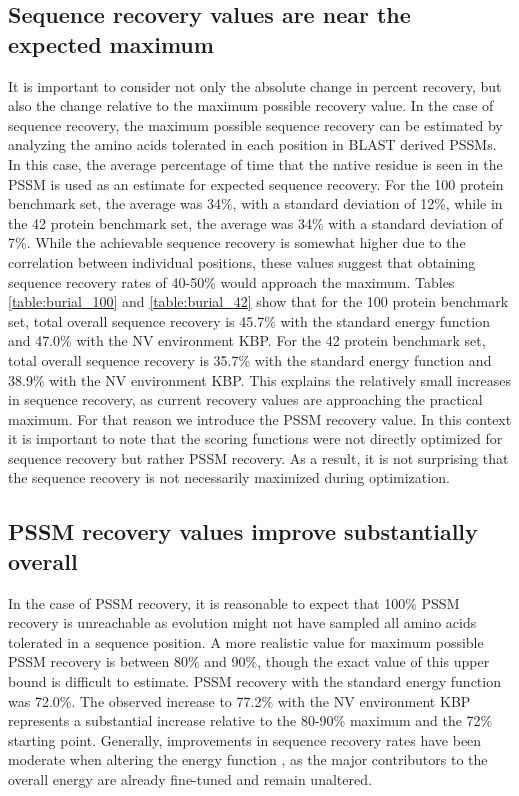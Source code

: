 \subsection{Sequence recovery values are near the expected maximum}
It is important to consider not only the absolute change in percent recovery, but also the change relative to the maximum possible recovery value.
In the case of sequence recovery, the maximum possible sequence recovery can be estimated by analyzing the amino acids tolerated in each position in \ac{BLAST} derived \ac{PSSM}s.
In this case, the average percentage of time that the native residue is seen in the \ac{PSSM} is used as an estimate for expected sequence recovery.
For the 100 protein benchmark set, the average was 34\%, with a standard deviation of 12\%, while in the 42 protein benchmark set, the average was 34\% with a standard deviation of 7\%.
While the achievable sequence recovery is somewhat higher due to the correlation between individual positions, these values suggest that obtaining sequence recovery rates of 40-50\% would approach the maximum.
Tables \ref{table:burial_100} and \ref{table:burial_42} show that for the 100 protein benchmark set, total overall sequence recovery is 45.7\% with the standard energy function and 47.0\% with the \ac{NV} environment \ac{KBP}.
For the 42 protein benchmark set, total overall sequence recovery is 35.7\% with the standard energy function and 38.9\% with the \ac{NV} environment \ac{KBP}.
This explains the relatively small increases in sequence recovery, as current recovery values are approaching the practical maximum.
For that reason we introduce the \ac{PSSM} recovery value.
In this context it is important to note that the scoring functions were not directly optimized for sequence recovery but rather \ac{PSSM} recovery.
As a result, it is not surprising that the sequence recovery is not necessarily maximized during optimization. 

\subsection{PSSM recovery values improve substantially overall}
In the case of \ac{PSSM} recovery, it is reasonable to expect that 100\% \ac{PSSM} recovery is unreachable as evolution might not have sampled all amino acids tolerated in a sequence position.
A more realistic value for maximum possible \ac{PSSM} recovery is between 80\% and 90\%, though the exact value of this upper bound is difficult to estimate. \ac{PSSM} recovery with the standard energy function was 72.0\%.
The observed increase to 77.2\% with the \ac{NV} environment \ac{KBP} represents a substantial increase relative to the 80-90\% maximum and the 72\% starting point.
Generally, improvements in sequence recovery rates have been moderate when altering the energy function \citep{Kortemme:2003td}, as the major contributors to the overall energy are already fine-tuned and remain unaltered. 

